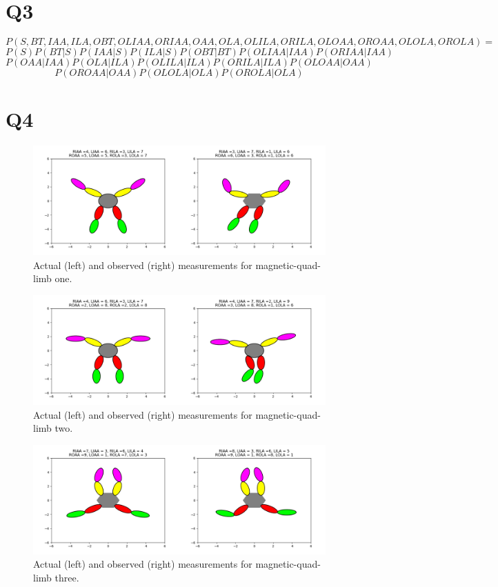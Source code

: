 \documentclass{article}
\begin{document}
\section{Q3}

$$
P(S, BT, IAA, ILA, OBT, OLIAA, ORIAA, OAA, OLA, OLILA, ORILA, OLOAA, OROAA, OLOLA, OROLA) =
$$ $$
P(S) P(BT | S) P(IAA | S) P(ILA | S) P(OBT | BT) P(OLIAA | IAA) P(ORIAA | IAA)
$$ $$
P(OAA | IAA) P(OLA | ILA) P(OLILA | ILA) P(ORILA | ILA) P(OLOAA | OAA)
$$ $$
P(OROAA | OAA) P(OLOLA | OLA) P(OROLA | OLA)
$$

\section{Q4}

\begin{figure}[!ht]
	\centering
	\includegraphics[width=120mm]{figs/mql-1.png}
	\caption{Actual (left) and observed (right) measurements for magnetic-quad-limb one.}
\end{figure}
\begin{figure}[!ht]
	\centering
	\includegraphics[width=120mm]{figs/mql-2.png}
	\caption{Actual (left) and observed (right) measurements for magnetic-quad-limb two.}
\end{figure}
\begin{figure}[!ht]
	\centering
	\includegraphics[width=120mm]{figs/mql-3.png}
	\caption{Actual (left) and observed (right) measurements for magnetic-quad-limb three.}
\end{figure}
\end{document}
